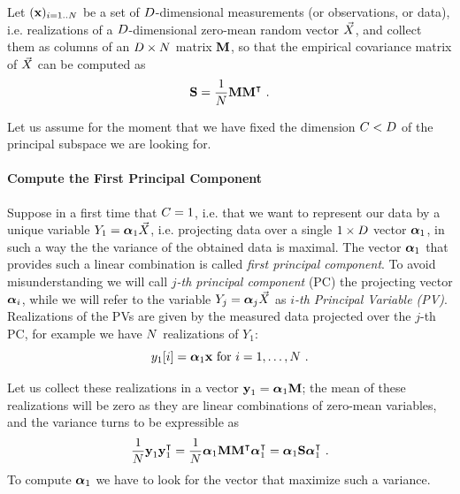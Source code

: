 Let $(\textbf{x})_{i=1..N}$ be a set of $D$-dimensional measurements (or observations, or data), i.e. realizations of a $D$-dimensional zero-mean random vector $\vec{X}{}$, and collect them as columns of an $D \times N$ matrix $\textbf{M}$, so that the empirical covariance matrix of $\vec{X}{}$ can be computed as 
\begin{equation}
\textbf{S} = \frac{1}{N}\textbf{M}\textbf{M}^\intercal \mbox{ .}
\end{equation}

Let us assume for the moment that we have fixed the dimension $C<D$ of the principal subspace we are looking for. 

\paragraph{Compute the First Principal Component}
Suppose in a first time that $C = 1$, i.e. that we want to represent our data by a unique variable $Y_1 =  \boldsymbol{\alpha}_1 \vec{X}{}$, i.e. projecting data over a single $ 1 \times D$ vector $\boldsymbol{\alpha}_1$, in such a way the the variance of the obtained data is maximal. The vector $\boldsymbol{\alpha}_1$ that provides such a linear combination is called {\em first principal component}. 
To avoid misunderstanding we will call {\em $j$-th principal component} (PC) the projecting vector $\boldsymbol{\alpha}_i$, while we will refer to the variable $Y_j = \boldsymbol{\alpha}_j \vec{X}{}$ as {\em $i$-th Principal Variable (PV)}. 
Realizations of the PVs are given by the measured data projected over the $j$-th PC, for example we have $N $ realizations of $Y_1$:
\begin{equation}
y_1[i] = \boldsymbol{\alpha}_1 \textbf{x} \mbox{ for } i=1,\dots , N \mbox{ .}
\end{equation}

Let us collect these realizations in a vector $\textbf{y}_1 = \boldsymbol{\alpha}_1 \textbf{M} $; the mean of these realizations will be zero as they are linear combinations of zero-mean variables, and the variance turns to be expressible as
\begin{equation}
\frac{1}{N}\textbf{y}_1\textbf{y}_1^\intercal = \frac{1}{N}\boldsymbol{\alpha}_1\textbf{M}\textbf{M}^\intercal\boldsymbol{\alpha}_1^\intercal = \boldsymbol{\alpha}_1\textbf{S}\boldsymbol{\alpha}_1^\intercal \mbox{ .}
\end{equation}
To compute $\boldsymbol{\alpha}_1$ we have to look for the vector that maximize such a variance.\\


